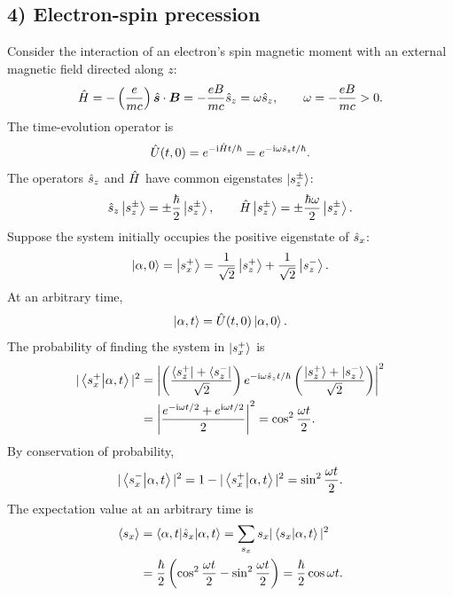 \subsection*{4) Electron-spin precession}
Consider the interaction of an electron's spin magnetic moment with an external magnetic field directed along $z$:
\begin{equation}
\hat{H}=-\left(\frac{e}{mc}\right)\hat{\bm{s}}\cdot\bm{B}
=-\frac{eB}{mc}\hat{s}_z=\omega\hat{s}_z,
\qquad\omega=-\frac{eB}{mc}>0.
\end{equation}
The time-evolution operator is
\begin{equation}
\hat{U}(t,0)=e^{-\mathrm{i}\hat{H}t/\hbar}=e^{-\mathrm{i}\omega\hat{s}_z t/\hbar}.
\end{equation}
The operators $\hat{s}_z$ and $\hat{H}$ have common eigenstates $\left|s_z^{\pm}\right\rangle$:
\begin{equation}
\hat{s}_z\left|s_z^{\pm}\right\rangle=\pm\frac{\hbar}{2}\left|s_z^{\pm}\right\rangle,\qquad
\hat{H}\left|s_z^{\pm}\right\rangle=\pm\frac{\hbar\omega}{2}\left|s_z^{\pm}\right\rangle.
\end{equation}
Suppose the system initially occupies the positive eigenstate of $\hat{s}_x$:
\begin{equation}
\left|\alpha,0\right\rangle=\left|s_x^+\right\rangle=\frac1{\sqrt2}\left|s_z^+\right\rangle+\frac1{\sqrt2}\left|s_z^-\right\rangle.
\end{equation}
At an arbitrary time,
\begin{equation}
\left|\alpha,t\right\rangle=\hat{U}(t,0)\left|\alpha,0\right\rangle.
\end{equation}
The probability of finding the system in $\left|s_x^+\right\rangle$ is
\begin{equation}
\begin{split}
|\left\langle s_x^+\middle|\alpha,t\right\rangle|^2
&=\left|\left(\frac{\left\langle s_z^+\right|+\left\langle s_z^-\right|}{\sqrt2}\right)
 e^{-\mathrm{i}\omega\hat{s}_z t/\hbar}
 \left(\frac{\left|s_z^+\right\rangle+\left|s_z^-\right\rangle}{\sqrt2}\right)\right|^2\\
&=\left|\frac{e^{-\mathrm{i}\omega t/2}+e^{\mathrm{i}\omega t/2}}{2}\right|^2
=\cos^2\frac{\omega t}{2}.
\end{split}
\end{equation}
By conservation of probability,
\begin{equation}
|\left\langle s_x^-\middle|\alpha,t\right\rangle|^2=1-|\left\langle s_x^+\middle|\alpha,t\right\rangle|^2
=\sin^2\frac{\omega t}{2}.
\end{equation}
The expectation value at an arbitrary time is
\begin{equation}
\begin{split}
\langle s_x\rangle
&=\left\langle\alpha,t\middle|\hat{s}_x\middle|\alpha,t\right\rangle
=\sum_{s_x}s_x|\left\langle s_x\middle|\alpha,t\right\rangle|^2\\
&=\frac{\hbar}{2}\left(\cos^2\frac{\omega t}{2}-\sin^2\frac{\omega t}{2}\right)
=\frac{\hbar}{2}\cos\omega t.
\end{split}
\end{equation}
